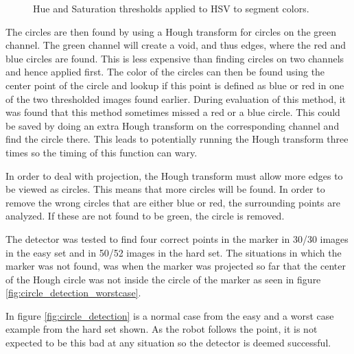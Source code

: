 \begin{figure}[h]
\caption{Hue and Saturation thresholds applied to HSV to segment colors.}
\label{fig:hsv_color_segmentation}
\end{figure}

The circles are then found by using a Hough transform for circles on the green channel.
The green channel will create a void, and thus edges, where the red and blue circles are found.
This is less expensive than finding circles on two channels and hence applied first.
The color of the circles can then be found using the center point of the circle and lookup if this point is defined as blue or red in one of the two thresholded images found earlier.
During evaluation of this method, it was found that this method sometimes missed a red or a blue circle.
This could be saved by doing an extra Hough transform on the corresponding channel and find the circle there.
This leads to potentially running the Hough transform three times so the timing of this function can wary.

In order to deal with projection, the Hough transform must allow more edges to be viewed as circles.
This means that more circles will be found.
In order to remove the wrong circles that are either blue or red, the surrounding points are analyzed.
If these are not found to be green, the circle is removed.

The detector was tested to find four correct points in the marker in 30/30 images in the easy set and in 50/52 images in the hard set.
The situations in which the marker was not found, was when the marker was projected so far that the center of the Hough circle was not inside the circle of the marker as seen in figure \ref{fig:circle_detection_worstcase}.

In figure \ref{fig:circle_detection} is a normal case from the easy and a worst case example from the hard set shown.
As the robot follows the point, it is not expected to be this bad at any situation so the detector is deemed successful.

